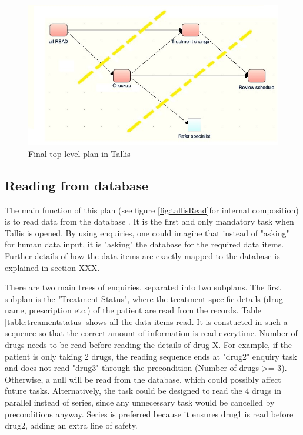 \documentclass[11pt]{article}
\begin{document}
\begin{figure}[ht]
\begin{center}
\includegraphics[scale=1]{tallisAll2}
\caption{Final top-level plan in Tallis}
\label{fig:tallisAll2}
\end{center}
\end{figure}

\subsection{Reading from database}

The main function of this plan (see figure \ref{fig:tallisRead}for internal composition) is to read data from the database .  It is the first and only mandatory task when Tallis is opened.  By using enquiries, one could imagine that instead of "asking" for human data input, it is "asking" the database for the required data items.  Further details of how the data items are exactly mapped to the database is explained in section XXX.  

There are two main trees of enquiries, separated into two subplans.  The first subplan is the "Treatment Status", where the treatment specific details (drug name, prescription etc.) of the patient are read from the records.  Table \ref{table:treamentstatus}	 shows all the data items read. It is constucted in such a sequence so that the correct amount of information is read everytime. Number of drugs needs to be read before reading the details of drug X. For example, if the patient is only taking 2 drugs, the reading sequence ends at "drug2" enquiry task and does not read "drug3" through the precondition (Number of drugs  >= 3). Otherwise, a null will be read from the database, which could possibly affect future tasks.  Alternatively, the task could be designed to read the 4 drugs in parallel instead of series, since any unnecessary task would be cancelled by preconditions anyway. Series is preferred because it ensures drug1 is read before drug2, adding an extra line of safety.  
\end{document}
